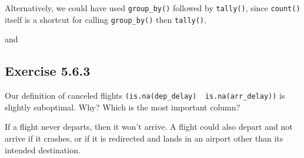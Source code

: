 \documentclass[]{book}
\newenvironment{Shaded}{\begin{snugshade}}{\end{snugshade}}
\newcommand{\CommentTok}[1]{\textcolor[rgb]{0.56,0.35,0.01}{\textit{#1}}}
\newcommand{\KeywordTok}[1]{\textcolor[rgb]{0.13,0.29,0.53}{\textbf{#1}}}
\newcommand{\NormalTok}[1]{#1}
\newcommand{\OperatorTok}[1]{\textcolor[rgb]{0.81,0.36,0.00}{\textbf{#1}}}
\newcommand{\StringTok}[1]{\textcolor[rgb]{0.31,0.60,0.02}{#1}}
\theoremstyle{plain}
\theoremstyle{remark}
\begin{document}
Alternatively, we could have used \texttt{group\_by()} followed by
\texttt{tally()}, since \texttt{count()} itself is a shortcut for
calling \texttt{group\_by()} then \texttt{tally()},

\begin{Shaded}
\end{Shaded}

and

\begin{Shaded}
\end{Shaded}

\hypertarget{exercise-5.6.3}{%
\subsection*{\texorpdfstring{Exercise
{5.6.3}}{Exercise 5.6.3}}\label{exercise-5.6.3}}

Our definition of canceled flights
\texttt{(is.na(dep\_delay)\ \textbar{}\ is.na(arr\_delay))} is slightly
suboptimal. Why? Which is the most important column?

If a flight never departs, then it won't arrive. A flight could also
depart and not arrive if it crashes, or if it is redirected and lands in
an airport other than its intended destination.
\end{document}
